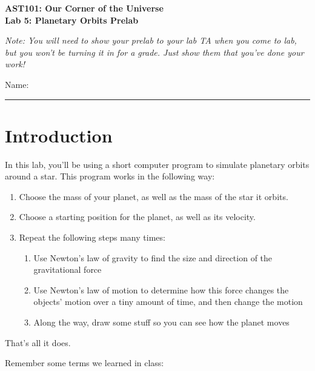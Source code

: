 \documentclass[11pt]{article}
\begin{document}
\begin{center}
\textbf{\Large
AST101: Our Corner of the Universe \\
\vspace*{0.1cm}
Lab 5: Planetary Orbits Prelab
}

\normalsize
\it Note: You will need to show your prelab to your lab TA when you come to lab, but you won't be turning it in for a grade. Just show them that you've done your work!
\end{center}

\vspace*{0.5cm}

{\Large Name:}\vspace*{0.5cm}\\\hrule

\vspace*{0.5cm}

\section{Introduction}

In this lab, you'll be using a short computer program to simulate planetary orbits around a star. This program works in the following way:

\begin{enumerate}
	\item Choose the mass of your planet, as well as the mass of the star it orbits.
	\item Choose a starting position for the planet, as well as its velocity. 
	\item Repeat the following steps many times:
	\begin{enumerate}
		\item Use Newton's law of gravity to find the size and direction of the gravitational force
		\item Use Newton's law of motion to determine how this force changes the objects' motion over a tiny amount of time, and then change the motion
		\item Along the way, draw some stuff so you can see how the planet moves
	\end{enumerate}
\end{enumerate}

That's all it does. 

Remember some terms we learned in class:
\end{document}
